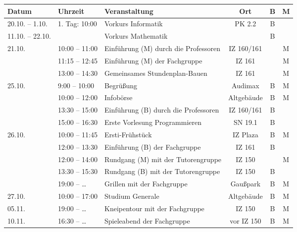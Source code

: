 \begin{figure}[h]
\begin{tabular}{|l|l|p{6.7cm}|c|c|c|}
\hline \textbf{Datum} & \textbf{Uhrzeit} & \textbf{Veranstaltung}	& \textbf{Ort} & \textbf{B} & \textbf{M} \\
\hline 20.10. – 1.10.
				& 1. Tag: 10:00	 & Vorkurs Informatik					& PK 2.2		&B& \\
\hline 11.10. – 22.10. 
				&	 	 		 & Vorkurs Mathematik 					&				&B& \\
\hline 21.10.
				& 10:00 – 11:00	 & Einführung (M) \newline durch die Professoren	& IZ 160/161	& &M\\
\hline 			& 11:15 – 12:45	 & Einführung (M) der Fachgruppe		& IZ 161		& &M\\
\hline 			& 13:00 – 14:30	 & Gemeinsames Stundenplan-Bauen		& IZ 161		& &M\\
\hline 25.10.	&  9:00 – 10:00	 & Begrüßung							& Audimax		&B&M\\
\hline 			& 10:00 – 12:00	 & Infobörse							& Altgebäude	&B&M\\
\hline 			& 13:30 – 15:00	 & Einführung (B) \newline durch die Professoren	& IZ 160/161	&B& \\
\hline 			& 15:00 – 16:30	 & Erste Vorlesung Programmieren		& SN 19.1		&B& \\
\hline 26.10.	& 10:00 – 11:45	 & Ersti-Frühstück						& IZ Plaza		&B&M\\
\hline 			& 12:00 – 13:30	 & Einführung (B) der Fachgruppe		& IZ 161		&B& \\
\hline 			& 12:00 – 14:00	 & Rundgang (M) \newline mit der Tutorengruppe	& IZ 150		& &M\\
\hline 			& 13:30 – 15:30	 & Rundgang (B) \newline mit der Tutorengruppe	& IZ 150		&B& \\
\hline 			& 19:00 – \ldots & Grillen mit der Fachgruppe			& Gaußpark		&B&M\\
\hline 27.10.	& 10:00 – 17:00	 & Studium Generale						& Altgebäude	&B&M\\
\hline 05.11.	& 19:00 – \ldots & Kneipentour mit der Fachgruppe		& IZ 150		&B&M\\
\hline 10.11.	& 16:30 – \ldots & Spieleabend der Fachgruppe			& vor IZ 150	&B&M\\ 
\end{tabular} 
\end{figure}

\newpage

